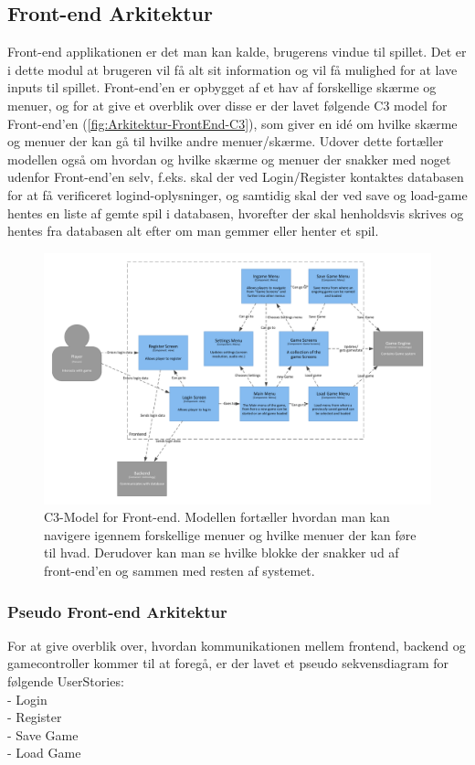 \subsection{Front-end Arkitektur}

Front-end applikationen er det man kan kalde, brugerens vindue til spillet. Det er i dette modul at brugeren vil få alt sit information
og vil få mulighed for at lave inputs til spillet. 
Front-end'en er opbygget af et hav af forskellige skærme og menuer, og for at give et overblik over disse er der lavet følgende C3 model
for Front-end'en (\autoref{fig:Arkitektur-FrontEnd-C3}), som giver en idé om hvilke skærme og menuer der kan gå til hvilke andre menuer/skærme.
Udover dette fortæller modellen også om hvordan og hvilke skærme og menuer der snakker med noget udenfor Front-end'en selv, f.eks. skal der
ved Login/Register kontaktes databasen for at få verificeret logind-oplysninger, og samtidig skal der ved save og load-game hentes en liste af
gemte spil i databasen, hvorefter der skal henholdsvis skrives og hentes fra databasen alt efter om man gemmer eller henter et spil.

\begin{figure}[H]
\centering
\includegraphics[width = \textwidth]{02-Body/Images/Frontend_C3.pdf}
\caption{C3-Model for Front-end. Modellen fortæller hvordan man kan navigere igennem forskellige menuer og hvilke menuer der kan føre til hvad. Derudover kan man se hvilke blokke der snakker ud af front-end'en og sammen med resten af systemet.}
\label{fig:Arkitektur-FrontEnd-C3}
\end{figure}

\subsubsection{Pseudo Front-end Arkitektur}
For at give overblik over, hvordan kommunikationen mellem frontend, backend og gamecontroller kommer til at foregå, er der lavet et pseudo sekvensdiagram for følgende UserStories:
\\
- Login\\
- Register\\
- Save Game\\
- Load Game\\


